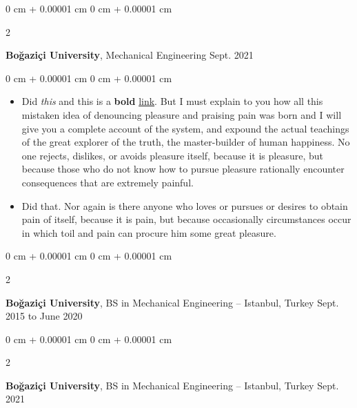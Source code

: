 \documentclass[10pt, letterpaper]{article}
\newenvironment{highlights}{
    \begin{itemize}[
        topsep=0.10 cm,
        parsep=0.10 cm,
        partopsep=0pt,
        itemsep=0pt,
        leftmargin=0 cm + 10pt
    ]
}{
    \end{itemize}
} %
\newenvironment{onecolentry}{
    \begin{adjustwidth}{
        0 cm + 0.00001 cm
    }{
        0 cm + 0.00001 cm
    }
}{
    \end{adjustwidth}
} %
\newenvironment{twocolentry}[2][]{
    \onecolentry
    \def\secondColumn{#2}
    \setcolumnwidth{\fill, 4.5 cm}
    \begin{paracol}{2}
}{
    \switchcolumn \raggedleft \secondColumn
    \end{paracol}
    \endonecolentry
} %
\begin{document}
        \vspace{0.2 cm}

        \begin{twocolentry}{
            Sept. 2021
        }
            \textbf{Boğaziçi University}, Mechanical Engineering\end{twocolentry}

        \vspace{0.10 cm}
        \begin{onecolentry}
            \begin{highlights}
                \item Did \textit{this} and this is a \textbf{bold} \href{https://example.com}{link}. But I must explain to you how all this mistaken idea of denouncing pleasure and praising pain was born and I will give you a complete account of the system, and expound the actual teachings of the great explorer of the truth, the master-builder of human happiness. No one rejects, dislikes, or avoids pleasure itself, because it is pleasure, but because those who do not know how to pursue pleasure rationally encounter consequences that are extremely painful.
                \item Did that. Nor again is there anyone who loves or pursues or desires to obtain pain of itself, because it is pain, but because occasionally circumstances occur in which toil and pain can procure him some great pleasure.
            \end{highlights}
        \end{onecolentry}


        \vspace{0.2 cm}

        \begin{twocolentry}{
            Sept. 2015 to June 2020
        }
            \textbf{Boğaziçi University}, BS in Mechanical Engineering -- Istanbul, Turkey\end{twocolentry}



        \vspace{0.2 cm}

        \begin{twocolentry}{
            Sept. 2021
        }
            \textbf{Boğaziçi University}, BS in Mechanical Engineering -- Istanbul, Turkey\end{twocolentry}



        \vspace{0.2 cm}
\end{document}
